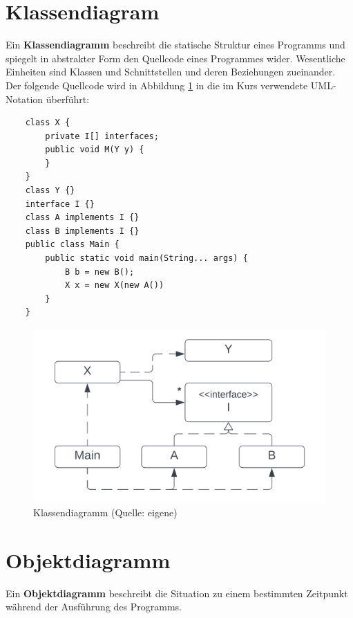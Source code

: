 
\section{Klassendiagram}
Ein \textbf{Klassendiagramm} beschreibt die statische Struktur eines Programms und spiegelt in abstrakter Form den Quellcode eines Programmes wider.
Wesentliche Einheiten sind Klassen und Schnittstellen und deren Beziehungen zueinander.
Der folgende Quellcode wird in Abbildung \ref{fig:cc-classdiagram} in die im Kurs verwendete UML-Notation überführt:

\begin{verbatim}
    class X {
        private I[] interfaces;
        public void M(Y y) {
        }
    }
    class Y {}
    interface I {}
    class A implements I {}
    class B implements I {}
    public class Main {
        public static void main(String... args) {
            B b = new B();
            X x = new X(new A())
        }
    }
\end{verbatim}

\begin{figure}
    \centering
    \includegraphics[scale=0.35]{chapters/Anhang/CheatSheets/img/classdiagram}
    \caption{Klassendiagramm (Quelle: eigene)}
    \label{fig:cc-classdiagram}
\end{figure}

\section{Objektdiagramm}
Ein \textbf{Objektdiagramm} beschreibt die Situation zu einem bestimmten Zeitpunkt während der Ausführung des Programms.\\

